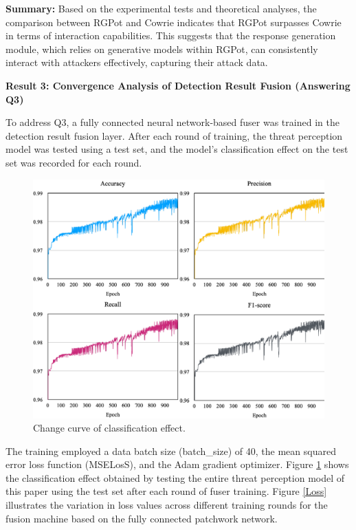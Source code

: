 \documentclass[journal]{IEEEtai}
\begin{document}
\textbf{Summary:}
Based on the experimental tests and theoretical analyses, the comparison between RGPot and Cowrie indicates that RGPot surpasses Cowrie in terms of interaction capabilities. 
This suggests that the response generation module, which relies on generative models within RGPot, can consistently interact with attackers effectively, capturing their attack data.

\textbf{Result 3: Convergence Analysis of Detection Result Fusion (Answering Q3)}



To address Q3, a fully connected neural network-based fuser was trained in the detection result fusion layer. 
After each round of training, the threat perception model was tested using a test set, and the model's classification effect on the test set was recorded for each round.

\begin{figure}[!h]
	\centering
	\includegraphics[width = 0.7\linewidth]{Figures/classification effect.pdf}
	\caption{Change curve of classification effect.}
	\label{classification effect}
\end{figure}



The training employed a data batch size (batch\_size) of 40, the mean squared error loss function (MSELosS), and the Adam gradient optimizer. 
Figure \ref{classification effect} shows the classification effect obtained by testing the entire threat perception model of this paper using the test set after each round of fuser training.
Figure \ref{Loss} illustrates the variation in loss values across different training rounds for the fusion machine based on the fully connected patchwork network.
\end{document}
